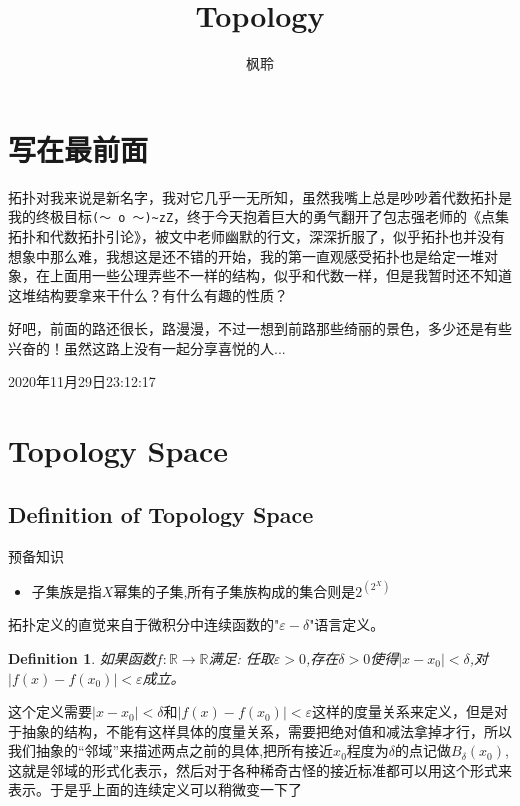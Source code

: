 \documentclass{article}
\newtheorem{definition}[theorem]{Definition}
\newcommand*{\xfunc}[4]{{#2}\colon{#3}{#1}{#4}}
\newcommand*{\func}[3]{\xfunc{\to}{#1}{#2}{#3}}
\begin{document}
\title{Topology}
\author{枫聆}
\maketitle

\tableofcontents

\newpage
\section{写在最前面}

拓扑对我来说是新名字，我对它几乎一无所知，虽然我嘴上总是吵吵着代数拓扑是我的终极目标\verb|(～ o ～)~zZ|，终于今天抱着巨大的勇气翻开了包志强老师的《点集拓扑和代数拓扑引论》，被文中老师幽默的行文，深深折服了，似乎拓扑也并没有想象中那么难，我想这是还不错的开始，我的第一直观感受拓扑也是给定一堆对象，在上面用一些公理弄些不一样的结构，似乎和代数一样，但是我暂时还不知道这堆结构要拿来干什么？有什么有趣的性质？

好吧，前面的路还很长，路漫漫，不过一想到前路那些绮丽的景色，多少还是有些兴奋的！虽然这路上没有一起分享喜悦的人...

2020年11月29日23:12:17
\newpage

\section{Topology Space}
\subsection{Definition of Topology Space} 
预备知识

\begin{itemize}
	\item 子集族是指$X$幂集的子集,所有子集族构成的集合则是$2^{(2^X)}$				
\end{itemize}


拓扑定义的直觉来自于微积分中连续函数的"$\varepsilon-\delta$"语言定义。

\begin{definition}
如果函数$\func{f}{\mathbb{R}}{\mathbb{R}}$满足: 任取$\varepsilon > 0$,存在$\delta > 0$使得$|x-x_0| < \delta$,对$|f(x)-f(x_0)| < \varepsilon$成立。
\end{definition}

这个定义需要$|x-x_0| < \delta$和$|f(x)-f(x_0)| < \varepsilon$这样的度量关系来定义，但是对于抽象的结构，不能有这样具体的度量关系，需要把绝对值和减法拿掉才行，所以我们抽象的“邻域”来描述两点之前的具体,把所有接近$x_0$程度为$\delta$的点记做$B_{\delta}(x_0)$,这就是邻域的形式化表示，然后对于各种稀奇古怪的接近标准都可以用这个形式来表示。于是乎上面的连续定义可以稍微变一下了
\end{document}
